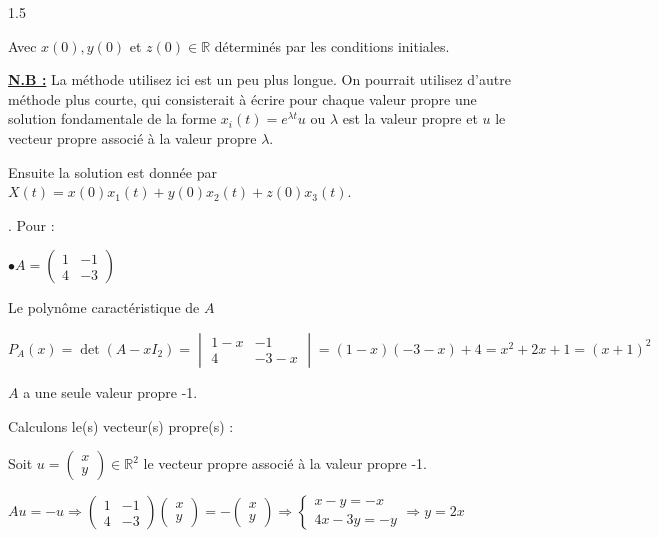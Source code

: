 \documentclass[12pt]{article}
\begin{document}
\begin{spacing}{1.5}
\restoregeometry %



Avec $x(0),y(0)$ et $z(0)\in \mathbb{R}$ déterminés par les conditions initiales.

\textbf{\underline{N.B :}} La méthode utilisez ici est un peu plus longue. On pourrait utilisez d'autre méthode plus courte, qui consisterait à écrire pour chaque valeur propre une solution fondamentale de la forme $x_i(t)=e^{\lambda t}u$ ou $\lambda$ est la valeur propre et $u$ le vecteur propre associé à la valeur propre $\lambda$.

Ensuite la solution est donnée par $X(t)=x(0)x_1(t)+y(0)x_2(t)+z(0)x_3(t)$.

. Pour :

$\bullet A=\begin{pmatrix}
1 & -1 \\
4 & -3
\end{pmatrix}$

Le polynôme caractéristique de $A$

$P_A(x)=\det(A-xI_2)=\begin{vmatrix}
1-x & -1 \\
4 & -3-x
\end{vmatrix}=(1-x)(-3-x)+4=x^2+2x+1=(x+1)^2$

$A$ a une seule valeur propre -1.

Calculons le(s) vecteur(s) propre(s) :

Soit $u=\begin{pmatrix}
x\\
y
\end{pmatrix}\in \mathbb{R}^2$ le vecteur propre associé à la valeur propre -1.

$Au=-u\Rightarrow \begin{pmatrix}
1 & -1 \\
4 & -3
\end{pmatrix}\begin{pmatrix}
x\\
y
\end{pmatrix}=-\begin{pmatrix}
x\\
y
\end{pmatrix}\Rightarrow \begin{cases}
x-y=-x\\
4x-3y=-y
\end{cases}\Rightarrow y=2x$


\end{spacing}
\end{document}
